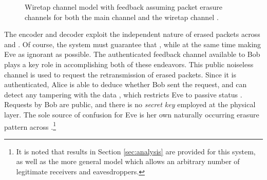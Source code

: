 \documentclass[10pt,twocolumn,twoside]{IEEEtran} \newlength{\pic}
\theoremstyle{definition}
\theoremstyle{remark}
\theoremstyle{plain}
\begin{document}
\begin{figure}
\begin{center}
\end{center}
\caption{Wiretap channel model with feedback assuming packet erasure channels for both the main channel  and the wiretap channel .}\label{fig:wiretapChannel}
\end{figure}

The encoder and decoder exploit the independent nature of erased packets across  and . Of course, the system must guarantee that , while at the same time making Eve as ignorant as possible. The authenticated feedback channel available to Bob plays a key role in accomplishing both of these endeavors. This public noiseless channel is used to request the retransmission of erased packets. Since it is authenticated, Alice is able to deduce whether Bob sent the request, and can detect any tampering with the data \cite{Stinson_CryptoBook}, which restricts Eve to passive status \cite{MaurerPart1}. Requests by Bob are public, and there is no \emph{secret key} employed at the physical layer. The sole source of confusion for Eve is her own naturally occurring erasure pattern across .\footnote{It is noted that results in Section \ref{sec:analysis} are provided for this system, as well as the more general model which allows an arbitrary number of legitimate receivers and eavesdroppers.}
\end{document}
